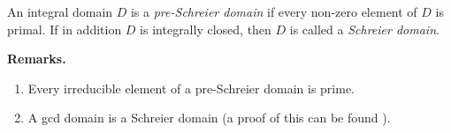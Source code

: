 \documentclass[12pt]{article}
\begin{document}
An integral domain $D$ is a \emph{pre-Schreier domain} if every non-zero element of $D$ is primal.  If in addition $D$ is integrally closed, then $D$ is called a \emph{Schreier domain}.

\textbf{Remarks.}
\begin{enumerate}
\item Every irreducible element of a pre-Schreier domain is prime.
\item A gcd domain is a Schreier domain (a proof of this can be found ).
\end{enumerate}
\end{document}

